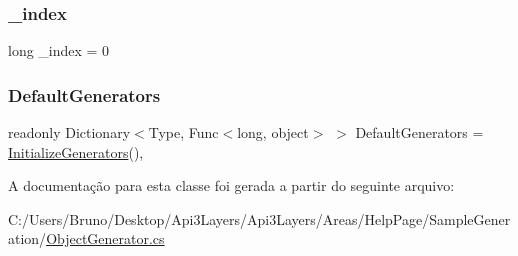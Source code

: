 \subsubsection{\texorpdfstring{\+\_\+index}{\_index}}
{\footnotesize\ttfamily long \+\_\+index = 0\hspace{0.3cm}{\ttfamily [private]}}

\mbox{\label{classApi3Layers_1_1Areas_1_1HelpPage_1_1ObjectGenerator_1_1SimpleTypeObjectGenerator_aa9ba1f31025dfd0ce77d398a8816481b}} 
\subsubsection{\texorpdfstring{Default\+Generators}{DefaultGenerators}}
{\footnotesize\ttfamily readonly Dictionary$<$Type, Func$<$long, object$>$ $>$ Default\+Generators = \hyperlink{classApi3Layers_1_1Areas_1_1HelpPage_1_1ObjectGenerator_1_1SimpleTypeObjectGenerator_a9d977fe87700eb793b2c9d3833882e88}{Initialize\+Generators}()\hspace{0.3cm}{\ttfamily [static]}, {\ttfamily [private]}}



A documentação para esta classe foi gerada a partir do seguinte arquivo\+:\begin{DoxyCompactItemize}
\item 
C\+:/\+Users/\+Bruno/\+Desktop/\+Api3\+Layers/\+Api3\+Layers/\+Areas/\+Help\+Page/\+Sample\+Generation/\hyperlink{ObjectGenerator_8cs}{Object\+Generator.\+cs}\end{DoxyCompactItemize}
